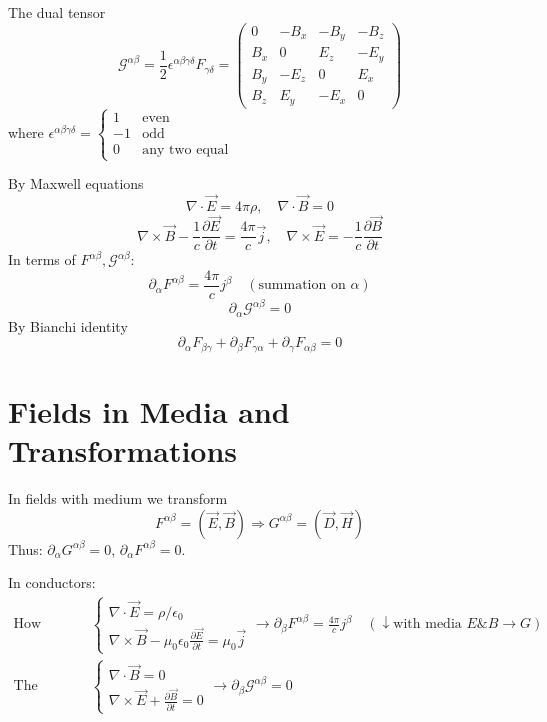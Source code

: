 \documentclass{article}
\begin{document}
	The dual tensor
	\[ \mathcal{G}^{\alpha\beta} = \frac{1}{2} \epsilon^{\alpha\beta\gamma\delta} F_{\gamma\delta} =
	\begin{pmatrix}
		0 & -B_x & -B_y & -B_z \\
		B_x & 0 & E_z & -E_y \\
		B_y & -E_z & 0 & E_x \\
		B_z & E_y & -E_x & 0
	\end{pmatrix}
	\]
	where $\epsilon^{\alpha\beta\gamma\delta} =
	\begin{cases}
		1 & \text{even} \\
		-1 & \text{odd} \\
		0 & \text{any two equal}
	\end{cases}
	$
	
	By Maxwell equations
	\[ \nabla \cdot \vec{E} = 4\pi\rho, \quad \nabla \cdot \vec{B} = 0 \]
	\[ \nabla \times \vec{B} - \frac{1}{c}\frac{\partial\vec{E}}{\partial t} = \frac{4\pi}{c}\vec{j}, \quad \nabla \times \vec{E} = -\frac{1}{c}\frac{\partial\vec{B}}{\partial t} \]
	In terms of $F^{\alpha\beta}, \mathcal{G}^{\alpha\beta}$:
	\[ \partial_\alpha F^{\alpha\beta} = \frac{4\pi}{c}j^\beta \quad (\text{summation on } \alpha) \]
	\[ \partial_\alpha \mathcal{G}^{\alpha\beta} = 0 \]
	By Bianchi identity
	\[ \partial_\alpha F_{\beta\gamma} + \partial_\beta F_{\gamma\alpha} + \partial_\gamma F_{\alpha\beta} = 0 \]
	
	\section{Fields in Media and Transformations}
	In fields with medium we transform
	\[ F^{\alpha\beta} = (\vec{E}, \vec{B}) \Rightarrow G^{\alpha\beta} = (\vec{D}, \vec{H}) \]
	Thus: $\partial_\alpha G^{\alpha\beta}=0$, $\partial_\alpha F^{\alpha\beta}=0$.
	
	In conductors:
	\begin{align*}
		\text{How source produces fields} &
		\begin{cases}
			\nabla \cdot \vec{E} = \rho/\epsilon_0 \\
			\nabla \times \vec{B} - \mu_0\epsilon_0\frac{\partial\vec{E}}{\partial t} = \mu_0\vec{j}
		\end{cases}
		\rightarrow \partial_\beta F^{\alpha\beta} = \frac{4\pi}{c}j^\beta \quad (\downarrow \text{with media } E\&B \to G) \\
		\text{The structure of fields themselves} &
		\begin{cases}
			\nabla \cdot \vec{B} = 0 \\
			\nabla \times \vec{E} + \frac{\partial\vec{B}}{\partial t} = 0
		\end{cases}
		\rightarrow \partial_\beta \mathcal{G}^{\alpha\beta} = 0
	\end{align*}
	
\end{document}
